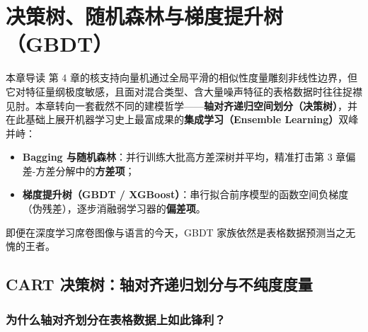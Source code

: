 \chapter[决策树、随机森林与 GBDT]{决策树、随机森林与梯度提升树（GBDT）}\label{ch:trees}

\begin{chapIntro}{本章导读}
第 4 章的核支持向量机通过全局平滑的相似性度量雕刻非线性边界，但它对特征量纲极度敏感，且面对混合类型、含大量噪声特征的表格数据时往往捉襟见肘。本章转向一套截然不同的建模哲学——\textbf{轴对齐递归空间划分（决策树）}，并在此基础上展开机器学习史上最富成果的\textbf{集成学习（Ensemble Learning）}双峰并峙：
\begin{itemize}
  \item \textbf{Bagging 与随机森林}：并行训练大批高方差深树并平均，精准打击第 3 章偏差-方差分解中的\textbf{方差项}；
  \item \textbf{梯度提升树（GBDT / XGBoost）}：串行拟合前序模型的函数空间负梯度（伪残差），逐步消融弱学习器的\textbf{偏差项}。
\end{itemize}
即便在深度学习席卷图像与语言的今天，GBDT 家族依然是表格数据预测当之无愧的王者。
\end{chapIntro}

\section{CART 决策树：轴对齐递归划分与不纯度度量}\label{sec:trees-cart}

\subsection{为什么轴对齐划分在表格数据上如此锋利？}

